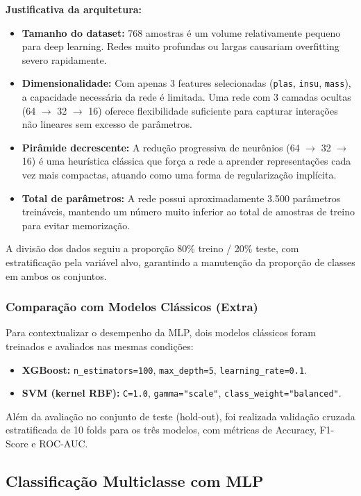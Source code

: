 \documentclass[12pt]{article}
\begin{document}
\textbf{Justificativa da arquitetura:}

\begin{itemize}
\item \textbf{Tamanho do dataset:} 768 amostras é um volume relativamente pequeno para deep learning. Redes muito profundas ou largas causariam overfitting severo rapidamente.
\item \textbf{Dimensionalidade:} Com apenas 3 features selecionadas (\texttt{plas}, \texttt{insu}, \texttt{mass}), a capacidade necessária da rede é limitada. Uma rede com 3 camadas ocultas (64 $\to$ 32 $\to$ 16) oferece flexibilidade suficiente para capturar interações não lineares sem excesso de parâmetros.
\item \textbf{Pirâmide decrescente:} A redução progressiva de neurônios (64 $\to$ 32 $\to$ 16) é uma heurística clássica que força a rede a aprender representações cada vez mais compactas, atuando como uma forma de regularização implícita.
\item \textbf{Total de parâmetros:} A rede possui aproximadamente 3.500 parâmetros treináveis, mantendo um número muito inferior ao total de amostras de treino para evitar memorização.

\end{itemize}
A divisão dos dados seguiu a proporção 80\% treino / 20\% teste, com estratificação pela variável alvo, garantindo a manutenção da proporção de classes em ambos os conjuntos.

\subsubsection{Comparação com Modelos Clássicos (Extra)}

Para contextualizar o desempenho da MLP, dois modelos clássicos foram treinados e avaliados nas mesmas condições:

\begin{itemize}
\item \textbf{XGBoost:} \texttt{n\_estimators=100}, \texttt{max\_depth=5}, \texttt{learning\_rate=0.1}.
\item \textbf{SVM (kernel RBF):} \texttt{C=1.0}, \texttt{gamma="scale"}, \texttt{class\_weight="balanced"}.

\end{itemize}
Além da avaliação no conjunto de teste (hold-out), foi realizada validação cruzada estratificada de 10 folds para os três modelos, com métricas de Accuracy, F1-Score e ROC-AUC.

\subsection{Classificação Multiclasse com MLP}
\end{document}
